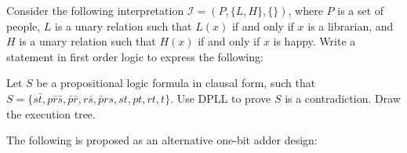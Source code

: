\documentclass[addpoints]{exam}
\newcommand{\tf}[1][{}]{%
\fillin[#1][0.25in]%
}
\begin{document}
\begin{questions}
\vspace{5mm}



\question[4] Consider the following interpretation $\mathcal{I} = (P,\{L,H\},\{\})$,
where $P$ is a set of people, $L$ is a unary relation such that $L(x)$ if and
only if $x$ is a librarian, and $H$ is a unary relation such that $H(x)$ if
and only if $x$ is happy. Write a statement in first order logic to express
the following:


\question[6] Let $S$ be a propositional logic formula in clausal form, such that
$S = \{s\bar{t}, p\bar{r}\bar{s}, \bar{p}\bar{r}, r\bar{s}, \bar{p}rs, st, pt,
  rt, t\}$. Use DPLL to prove $S$ is a contradiction. Draw the execution tree.

\vspace{60mm}


\question The following is proposed as an alternative one-bit adder design:


\end{questions}
\end{document}
